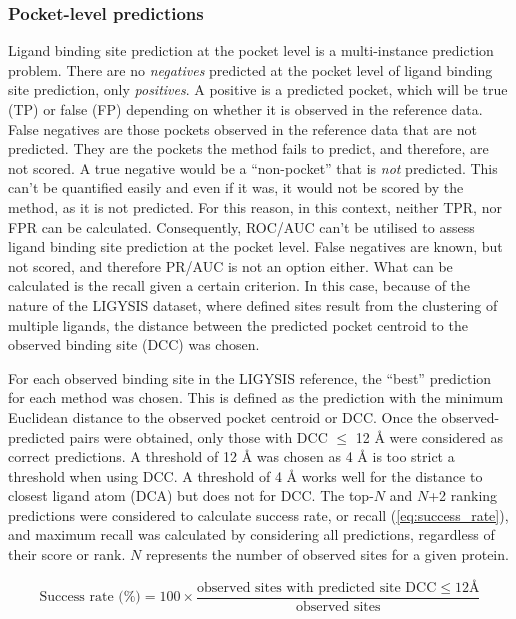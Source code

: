 \subsubsection{Pocket-level predictions}

Ligand binding site prediction at the pocket level is a multi-instance prediction problem. There are no \textit{negatives} predicted at the pocket level of ligand binding site prediction, only \textit{positives}. A positive is a predicted pocket, which will be true (TP) or false (FP) depending on whether it is observed in the reference data. False negatives are those pockets observed in the reference data that are not predicted. They are the pockets the method fails to predict, and therefore, are not scored. A true negative would be a ``non-pocket'' that is \textit{not} predicted. This can't be quantified easily and even if it was, it would not be scored by the method, as it is not predicted. For this reason, in this context, neither TPR, nor FPR can be calculated. Consequently, ROC/AUC can't be utilised to assess ligand binding site prediction at the pocket level. False negatives are known, but not scored, and therefore PR/AUC is not an option either. What can be calculated is the recall given a certain criterion. In this case, because of the nature of the LIGYSIS dataset, where defined sites result from the clustering of multiple ligands, the distance between the predicted pocket centroid to the observed binding site (DCC) was chosen.

For each observed binding site in the LIGYSIS reference, the ``best'' prediction for each method was chosen. This is defined as the prediction with the minimum Euclidean distance to the observed pocket centroid or DCC. Once the observed-predicted pairs were obtained, only those with DCC $\leq$ 12 \AA{} were considered as correct predictions. A threshold of 12 \AA{} was chosen as 4 \AA{} is too strict a threshold when using DCC. A threshold of 4 \AA{} works well for the distance to closest ligand atom (DCA) but does not for DCC. The top-$N$ and $N$+2 ranking predictions were considered to calculate success rate, or recall (\autoref{eq:success_rate}), and maximum recall was calculated by considering all predictions, regardless of their score or rank. $N$ represents the number of observed sites for a given protein.

\begin{equation}
\text{Success rate (\%)} = 100 \times \frac{\text{observed sites with predicted site DCC} \leq 12 \text{Å}}{\text{observed sites}}
\label{eq:success_rate}
\end{equation}

